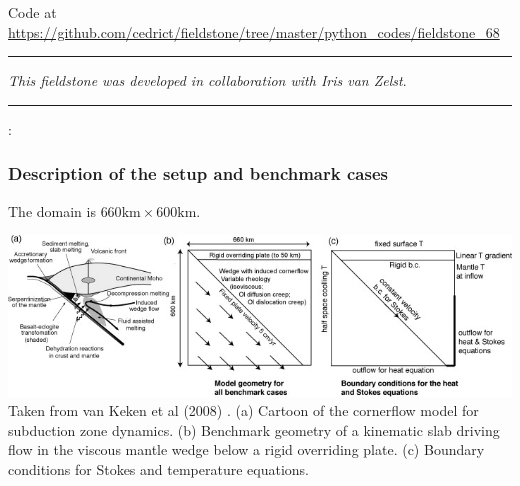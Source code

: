 

\begin{center}
Code at \url{https://github.com/cedrict/fieldstone/tree/master/python_codes/fieldstone_68}
\end{center}

\par\noindent\rule{\textwidth}{0.4pt}

{\sl This fieldstone was developed in collaboration with Iris van Zelst}. 

\par\noindent\rule{\textwidth}{0.4pt}



\Literature: \cite{vack08}\cite{syva10}\cite{vakn12}

\subsubsection*{Description of the setup and benchmark cases}


The domain is $660\text{km}\times 600\text{km}$. 

\begin{center}
\includegraphics[width=14cm]{python_codes/fieldstone_68/images/fig1}\\
{\captionfont Taken from van Keken et al (2008) \cite{vack08}.
(a) Cartoon of the cornerflow model for subduction zone dynamics. 
(b) Benchmark geometry of a kinematic slab driving flow in the viscous
mantle wedge below a rigid overriding plate. 
(c) Boundary conditions for Stokes and temperature equations.}
\end{center}


